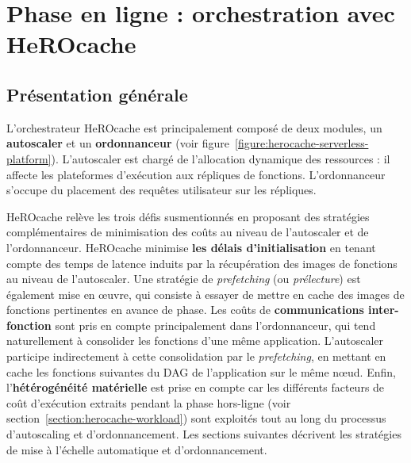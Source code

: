 \section{Phase en ligne : orchestration avec HeROcache} \label{section:herocache-contribution}

\subsection{Présentation générale}

L'orchestrateur HeROcache est principalement composé de deux modules, un \textbf{autoscaler} et un \textbf{ordonnanceur} (voir figure~\ref{figure:herocache-serverless-platform}). L'autoscaler est chargé de l'allocation dynamique des ressources : il affecte les plateformes d'exécution aux répliques de fonctions. L'ordonnanceur s'occupe du placement des requêtes utilisateur sur les répliques.

HeROcache relève les trois défis susmentionnés en proposant des stratégies complémentaires de minimisation des coûts au niveau de l'autoscaler et de l'ordonnanceur. HeROcache minimise \textbf{les délais d'initialisation} en tenant compte des temps de latence induits par la récupération des images de fonctions au niveau de l'autoscaler. Une stratégie de \textit{prefetching} (ou \textit{prélecture}) est également mise en œuvre, qui consiste à essayer de mettre en cache des images de fonctions pertinentes en avance de phase. Les coûts de \textbf{communications inter-fonction} sont pris en compte principalement dans l'ordonnanceur, qui tend naturellement à consolider les fonctions d'une même application. L'autoscaler participe indirectement à cette consolidation par le \textit{prefetching}, en mettant en cache les fonctions suivantes du DAG de l'application sur le même nœud. Enfin, l'\textbf{hétérogénéité matérielle} est prise en compte car les différents facteurs de coût d'exécution extraits pendant la phase hors-ligne (voir section~\ref{section:herocache-workload}) sont exploités tout au long du processus d'autoscaling et d'ordonnancement. Les sections suivantes décrivent les stratégies de mise à l'échelle automatique et d'ordonnancement.

